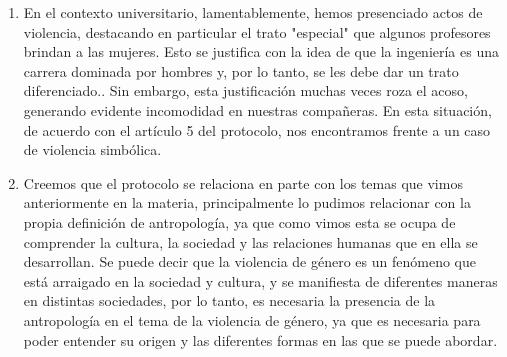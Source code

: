 \documentclass[12pt, a4paper]{article}
\begin{document}
\begin{enumerate}
      \item En el contexto universitario, lamentablemente, hemos presenciado actos de violencia, destacando en particular el trato "especial" que algunos profesores brindan a las mujeres. Esto se justifica con la idea de que la ingeniería es una carrera dominada por hombres y, por lo tanto, se les debe dar un trato diferenciado.. Sin embargo, esta justificación muchas veces roza el acoso, generando evidente incomodidad en nuestras compañeras. En esta situación, de acuerdo con el artículo 5 del protocolo, nos encontramos frente a un caso de violencia simbólica.

      \item Creemos que el protocolo se relaciona en parte con los temas que vimos anteriormente en la materia, principalmente lo pudimos relacionar con la propia definición de antropología, ya que como vimos esta se ocupa de comprender la cultura, la sociedad y las relaciones humanas que en ella se desarrollan. Se puede decir que la violencia de género es un fenómeno que está arraigado en la sociedad y cultura, y se manifiesta de diferentes maneras en distintas sociedades, por lo tanto, es necesaria la presencia de la antropología en el tema de la violencia de género, ya que es necesaria para poder entender su origen y las diferentes formas en las que se puede abordar.

    \end{enumerate}
    
\end{document}

